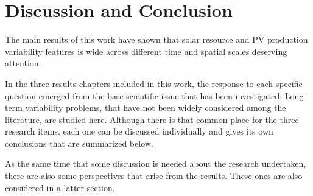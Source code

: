 


\chapter{Discussion and Conclusion\label{Conclusion}}

The main results of this work have shown that solar resource and PV production variability features is wide across different time and spatial scales deserving attention.  

In the three results chapters included in this work, the response to each specific question emerged from the base scientific issue that has been investigated. Long-term variability problems, that have not been widely considered among the literature, are studied here. Although there is that common place for the three research items, each one can be discussed individually and gives its own conclusions that are summarized below.

As the same time that some discussion is needed about the research undertaken, there are also some perspectives that arise from the results. These ones are also considered in a latter section.



